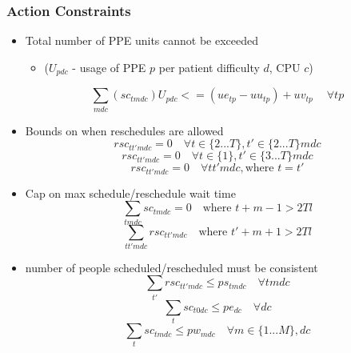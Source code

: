 \documentclass{article}
\begin{document}
\subsubsection{Action Constraints}
\label{action constraints}
\begin{itemize}
    \item Total number of PPE units cannot be exceeded  
    \begin{itemize}
    		\item ($U_{pdc}$ - usage of PPE $p$ per patient difficulty $d$, CPU $c$)
    \end{itemize}
        \begin{equation} 
			\sum_{mdc}(sc_{tmdc})U_{pdc} <= (ue_{tp} - uu_{tp}) + uv_{tp}\ \quad \forall tp
		\end{equation}
	
	\item Bounds on when reschedules are allowed
		\begin{equation}  
			rsc_{tt'mdc} = 0 \quad \forall t \in \{ 2...T \}, t' \in \{2...T\} mdc 
		\end{equation} 
		\begin{equation}  
			rsc_{tt'mdc} = 0 \quad \forall t \in \{ 1 \}, t'\in \{ 3...T \} mdc 
		\end{equation} 
		\begin{equation}  
			rsc_{tt'mdc} = 0 \quad \forall tt'mdc, \text{where } t=t' 
		\end{equation} 

	\item Cap on max schedule/reschedule wait time
		\begin{equation}  
			\sum_{tmdc} sc_{tmdc} = 0 \quad \text{where } t+m-1 > 2Tl 
		\end{equation} 
		\begin{equation}  
			\sum_{tt'mdc} rsc_{tt'mdc} \quad \text{where } t'+m+1 > 2Tl 
		\end{equation} 

	\item number of people scheduled/rescheduled must be consistent
		\begin{equation}  
			\sum_{t'} rsc_{tt'mdc} \le ps_{tmdc} \quad \forall tmdc 
		\end{equation} 
		\begin{equation}  
			\sum_{t} sc_{t0dc} \le pe_{dc} \quad \forall dc 
		\end{equation} 
		\begin{equation}  
			\sum_{t} sc_{tmdc} \le pw_{mdc} \quad \forall m \in \{1...M \}, dc 
		\end{equation} 
\end{itemize}
\end{document}
